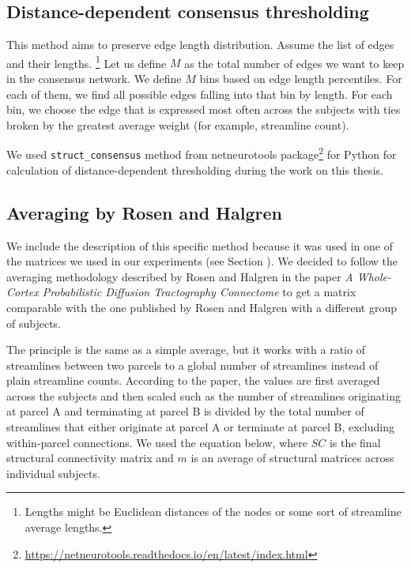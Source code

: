 \subsection{Distance-dependent consensus thresholding}\label{sec:dist-dep}

This method aims to preserve edge length distribution. Assume the list of edges and their lengths. \footnote{Lengths might be Euclidean distances of the nodes or some sort of streamline average lengths.} Let us define $M$ as the total number of edges we want to keep in the consensus network. We define $M$ bins based on edge length percentiles. For each of them, we find all possible edges falling into that bin by length. For each bin, we choose the edge that is expressed most often across the subjects with ties broken by the greatest average weight (for example, streamline count). \cite{betzel_distance-dependent_2019} 

We used \texttt{struct\_consensus} method from netneurotools package\footnote{\url{https://netneurotools.readthedocs.io/en/latest/index.html}} for Python for calculation of distance-dependent thresholding during the work on this thesis.

\subsection{Averaging by Rosen and Halgren}\label{sec:rh}

We include the description of this specific method because it was used in one of the matrices we used in our experiments (see Section \TODO). We decided to follow the averaging methodology described by Rosen and Halgren in the paper \textit{A Whole-Cortex Probabilistic Diffusion Tractography Connectome} \cite{rosen_whole-cortex_2021} to get a matrix comparable with the one published by Rosen and Halgren with a different group of subjects.

The principle is the same as a simple average, but it works with a ratio of streamlines between two parcels to a global number of streamlines instead of plain streamline counts. According to the paper, the values are first averaged across the subjects and then scaled such as the number of streamlines originating at parcel A and terminating at parcel B is divided by the total number of streamlines that either originate at parcel A or terminate at parcel B, excluding within-parcel connections. \cite{rosen_whole-cortex_2021} We used the equation below, where $SC$ is the final structural connectivity matrix and $m$ is an average of structural matrices across individual subjects.

